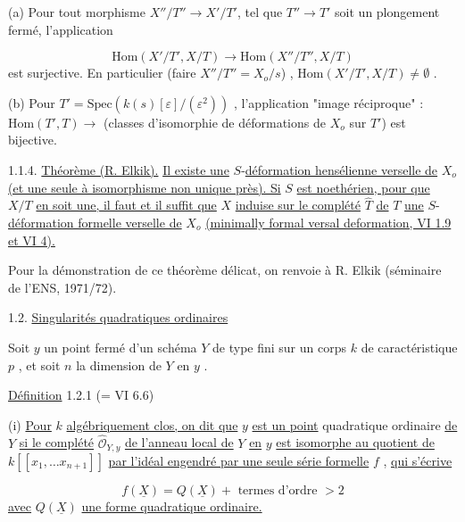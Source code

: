 (a)  Pour tout morphisme $X''/T'' \longrightarrow X'/T'$, tel que $T'' \to T'$ soit un plongement fermé, l'application

\begin{equation*}
\mathrm{Hom}(X'/T' , X/T) \longrightarrow \mathrm{Hom}(X''/T'' , X/T)
\end{equation*}
est surjective. En particulier (faire $X''/T'' = X_o/s$) , $\mathrm{Hom}(X'/T', X/T) \neq \emptyset$ .

(b)  Pour $T' = \mathrm{Spec}(k(s)[\varepsilon]/(\varepsilon^2))$ , l'application "image réciproque" : $\mathrm{Hom}(T',T) \to$ (classes d'isomorphie de déformations de $X_o$ sur $T'$) est bijective.



1.1.4. \underline{Théorème (R. Elkik).} \underline{Il existe une} $S$-\underline{déformation hensélienne verselle de} $X_o$ \underline{(et une seule à isomorphisme non unique près). Si} $S$ \underline{est noethérien, pour que} $X/T$ \underline{en soit une, il faut et il suffit que} $X$ \underline{induise sur le complété} $\widehat{T}$ \underline{de} $T$ \underline{une} $S$-\underline{déformation formelle verselle de} $X_o$ \underline{(minimally formal versal deformation, VI 1.9 et VI 4).}

Pour la démonstration de ce théorème délicat, on renvoie à R. Elkik (séminaire de l'ENS, 1971/72).


1.2. \underline{Singularités quadratiques ordinaires}

Soit $y$ un point fermé d'un schéma $Y$ de type fini sur un corps $k$ de caractéristique $p$ , et soit $n$ la dimension de $Y$ en $y$ .


\underline{Définition} 1.2.1 (= VI 6.6)

(i) \underline{Pour} $k$ \underline{algébriquement clos, on dit que} $y$ \underline{est un point} quadratique ordinaire \underline{de} $Y$ \underline{si le complété} $\widehat{\mathcal{O}}_{Y,y}$ \underline{de l'anneau local de} $Y$ \underline{en} $y$ \underline{est isomorphe au quotient de} $k[[x_1,\ldots x_{n+1}]]$ \underline{par l'idéal engendré par une seule série formelle} $f$ , \underline{qui s'écrive}

\begin{equation}\tag{1.2.1.1}
f(\underline{X}) = Q(\underline{X}) + \mbox{ termes d'ordre } > 2
\end{equation}
\underline{avec} $Q(\underline{X})$ \underline{une forme quadratique ordinaire.}

